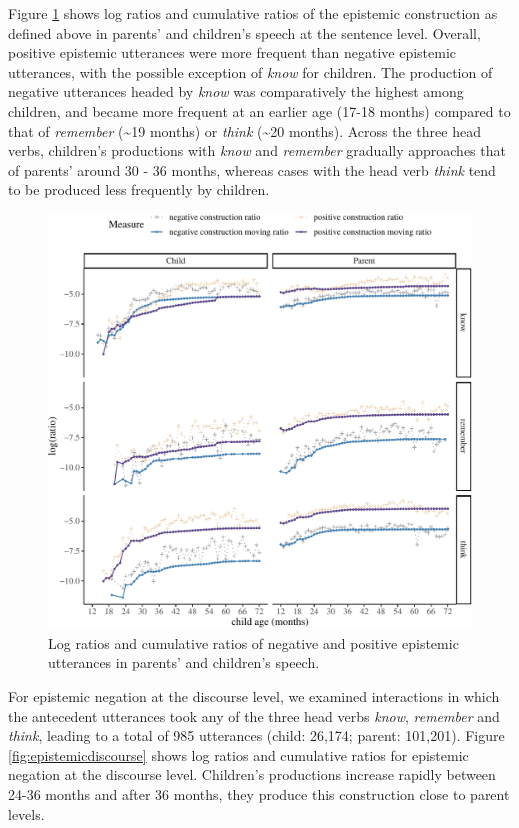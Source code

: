 \documentclass[
  english,
  man,floatsintext]{apa6}
\begin{document}
Figure \ref{fig:epistemic} shows log ratios and cumulative ratios of the epistemic construction as defined above in parents' and children's speech at the sentence level. Overall, positive epistemic utterances were more frequent than negative epistemic utterances, with the possible exception of \emph{know} for children. The production of negative utterances headed by \emph{know} was comparatively the highest among children, and became more frequent at an earlier age (17-18 months) compared to that of \emph{remember} (\textasciitilde19 months) or \emph{think} (\textasciitilde20 months). Across the three head verbs, children's productions with \emph{know} and \emph{remember} gradually approaches that of parents' around 30 - 36 months, whereas cases with the head verb \emph{think} tend to be produced less frequently by children.

\begin{figure}[H]

{\centering \includegraphics{neg_construction_article_files/figure-latex/epistemic-1} 

}

\caption{Log ratios and cumulative ratios of negative and positive epistemic utterances in parents' and children's speech.}\label{fig:epistemic}
\end{figure}

For epistemic negation at the discourse level, we examined interactions in which the antecedent utterances took any of the three head verbs \emph{know}, \emph{remember} and \emph{think}, leading to a total of 985 utterances (child: 26,174; parent: 101,201). Figure \ref{fig:epistemicdiscourse} shows log ratios and cumulative ratios for epistemic negation at the discourse level. Children's productions increase rapidly between 24-36 months and after 36 months, they produce this construction close to parent levels.
\end{document}
